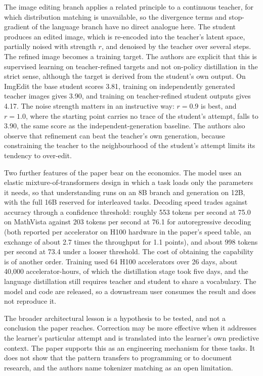 \documentclass[11pt]{article}
\theoremstyle{remark}
\begin{document}
The image editing branch applies a related principle to a continuous teacher, for which distribution matching is unavailable, so the divergence terms and stop-gradient of the language branch have no direct analogue here. The student produces an edited image, which is re-encoded into the teacher's latent space, partially noised with strength $r$, and denoised by the teacher over several steps. The refined image becomes a training target. The authors are explicit that this is supervised learning on teacher-refined targets and not on-policy distillation in the strict sense, although the target is derived from the student's own output. On ImgEdit the base student scores 3.81, training on independently generated teacher images gives 3.90, and training on teacher-refined student outputs gives 4.17. The noise strength matters in an instructive way: $r = 0.9$ is best, and $r = 1.0$, where the starting point carries no trace of the student's attempt, falls to 3.90, the same score as the independent-generation baseline. The authors also observe that refinement can beat the teacher's own generation, because constraining the teacher to the neighbourhood of the student's attempt limits its tendency to over-edit.

Two further features of the paper bear on the economics. The model uses an elastic mixture-of-transformers design in which a task loads only the parameters it needs, so that understanding runs on an 8B branch and generation on 12B, with the full 16B reserved for interleaved tasks. Decoding speed trades against accuracy through a confidence threshold: roughly 553 tokens per second at 75.0 on MathVista against 203 tokens per second at 76.1 for autoregressive decoding (both reported per accelerator on H100 hardware in the paper's speed table, an exchange of about 2.7 times the throughput for 1.1 points), and about 998 tokens per second at 73.4 under a looser threshold. The cost of obtaining the capability is of another order. Training used 64 H100 accelerators over 26 days, about 40{,}000 accelerator-hours, of which the distillation stage took five days, and the language distillation still requires teacher and student to share a vocabulary. The model and code are released, so a downstream user consumes the result and does not reproduce it.

The broader architectural lesson is a hypothesis to be tested, and not a conclusion the paper reaches. Correction may be more effective when it addresses the learner's particular attempt and is translated into the learner's own predictive context. The paper supports this as an engineering mechanism for these tasks. It does not show that the pattern transfers to programming or to document research, and the authors name tokenizer matching as an open limitation.
\end{document}
